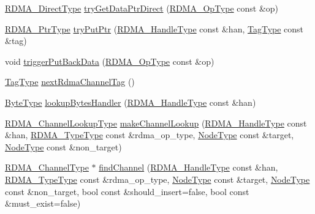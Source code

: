 \begin{DoxyCompactItemize}
\item 
\hyperlink{structvt_1_1rdma_1_1_r_d_m_a_manager_a8bce76d1b441ca17daf84835eb9a7dec}{R\+D\+M\+A\+\_\+\+Direct\+Type} \hyperlink{structvt_1_1rdma_1_1_r_d_m_a_manager_a49b9fd1ac1fcc391a45b7a4c8c796a2b}{try\+Get\+Data\+Ptr\+Direct} (\hyperlink{namespacevt_1_1rdma_a9b966d9780a2b41afe7cd7b7b4b20300}{R\+D\+M\+A\+\_\+\+Op\+Type} const \&op)
\item 
\hyperlink{namespacevt_a9e2c953286c7616f7c218e9951790776}{R\+D\+M\+A\+\_\+\+Ptr\+Type} \hyperlink{structvt_1_1rdma_1_1_r_d_m_a_manager_afe917ba8c9a44175dd0766f3f0321e61}{try\+Put\+Ptr} (\hyperlink{namespacevt_a10442579ec4e7ebef223818e64bcf908}{R\+D\+M\+A\+\_\+\+Handle\+Type} const \&han, \hyperlink{namespacevt_a84ab281dae04a52a4b243d6bf62d0e52}{Tag\+Type} const \&tag)
\item 
void \hyperlink{structvt_1_1rdma_1_1_r_d_m_a_manager_a02d9c1d18f6f15797ee2592613175069}{trigger\+Put\+Back\+Data} (\hyperlink{namespacevt_1_1rdma_a9b966d9780a2b41afe7cd7b7b4b20300}{R\+D\+M\+A\+\_\+\+Op\+Type} const \&op)
\item 
\hyperlink{namespacevt_a84ab281dae04a52a4b243d6bf62d0e52}{Tag\+Type} \hyperlink{structvt_1_1rdma_1_1_r_d_m_a_manager_a0c9f73f027924ee73cb2d9a8af520e1e}{next\+Rdma\+Channel\+Tag} ()
\item 
\hyperlink{namespacevt_aab8d55968084610ce3b17057981e9300}{Byte\+Type} \hyperlink{structvt_1_1rdma_1_1_r_d_m_a_manager_a3d8b57617a652d55cf2714930d618c05}{lookup\+Bytes\+Handler} (\hyperlink{namespacevt_a10442579ec4e7ebef223818e64bcf908}{R\+D\+M\+A\+\_\+\+Handle\+Type} const \&han)
\item 
\hyperlink{structvt_1_1rdma_1_1_r_d_m_a_manager_a3df5b264f344d9d4530a96264782a725}{R\+D\+M\+A\+\_\+\+Channel\+Lookup\+Type} \hyperlink{structvt_1_1rdma_1_1_r_d_m_a_manager_a8f6d4973f9ea76e2be99d1aac105fff7}{make\+Channel\+Lookup} (\hyperlink{namespacevt_a10442579ec4e7ebef223818e64bcf908}{R\+D\+M\+A\+\_\+\+Handle\+Type} const \&han, \hyperlink{namespacevt_1_1rdma_ac848e1d9da43db6294bd06f83e5d3946}{R\+D\+M\+A\+\_\+\+Type\+Type} const \&rdma\+\_\+op\+\_\+type, \hyperlink{namespacevt_a866da9d0efc19c0a1ce79e9e492f47e2}{Node\+Type} const \&target, \hyperlink{namespacevt_a866da9d0efc19c0a1ce79e9e492f47e2}{Node\+Type} const \&non\+\_\+target)
\item 
\hyperlink{structvt_1_1rdma_1_1_r_d_m_a_manager_ad6a7e417dca07fe5743318e1153677a8}{R\+D\+M\+A\+\_\+\+Channel\+Type} $\ast$ \hyperlink{structvt_1_1rdma_1_1_r_d_m_a_manager_a51f828fcbb55e1b4c883746c490b77f0}{find\+Channel} (\hyperlink{namespacevt_a10442579ec4e7ebef223818e64bcf908}{R\+D\+M\+A\+\_\+\+Handle\+Type} const \&han, \hyperlink{namespacevt_1_1rdma_ac848e1d9da43db6294bd06f83e5d3946}{R\+D\+M\+A\+\_\+\+Type\+Type} const \&rdma\+\_\+op\+\_\+type, \hyperlink{namespacevt_a866da9d0efc19c0a1ce79e9e492f47e2}{Node\+Type} const \&target, \hyperlink{namespacevt_a866da9d0efc19c0a1ce79e9e492f47e2}{Node\+Type} const \&non\+\_\+target, bool const \&should\+\_\+insert=false, bool const \&must\+\_\+exist=false)
\end{DoxyCompactItemize}
